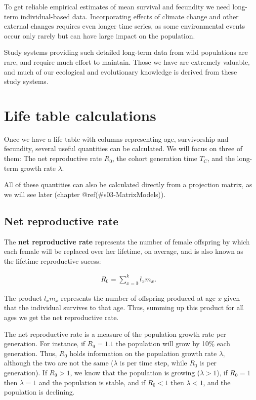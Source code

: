 \documentclass[
]{book}
\begin{document}
To get reliable empirical estimates of mean survival and fecundity we need long-term individual-based data. Incorporating effects of climate change and other external changes requires even longer time series, as some environmental events occur only rarely but can have large impact on the population.

Study systems providing such detailed long-term data from wild populations are rare, and require much effort to maintain. Those we have are extremely valuable, and much of our ecological and evolutionary knowledge is derived from these study systems.

\hypertarget{life-table-calculations}{%
\section{Life table calculations}\label{life-table-calculations}}

Once we have a life table with columns representing age, survivorship and fecundity, several useful quantities can be calculated. We will focus on three of them: The net reproductive rate \(R_0\), the cohort generation time \(T_C\), and the long-term growth rate \(\lambda\).

All of these quantities can also be calculated directly from a projection matrix, as we will see later (chapter @ref(\#s03-MatrixModels)).

\hypertarget{net-reproductive-rate}{%
\subsection{Net reproductive rate}\label{net-reproductive-rate}}

The \textbf{net reproductive rate} represents the number of female offspring by which each female will be replaced over her lifetime, on average, and is also known as the lifetime reproductive sucess:

\begin{align}
R_0=\sum_{x=0}^k l_xm_x.
\label{eq:R0}
\end{align}

The product \(l_xm_x\) represents the number of offspring produced at age \(x\) given that the individual survives to that age. Thus, summing up this product for all ages we get the net reproductive rate.

The net reproductive rate is a measure of the population growth rate per generation. For instance, if \(R_0=1.1\) the population will grow by 10\% each generation. Thus, \(R_0\) holds information on the population growth rate \(\lambda\), although the two are not the same (\(\lambda\) is per time step, while \(R_0\) is per generation). If \(R_0>1\), we know that the population is growing (\(\lambda>1\)), if \(R_0=1\) then \(\lambda=1\) and the population is stable, and if \(R_0<1\) then \(\lambda<1\), and the population is declining.
\end{document}

